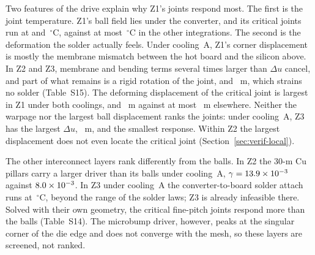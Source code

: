 Two features of the drive explain why Z1's joints respond most. The first is the joint temperature. Z1's ball field
lies under the converter, and its critical joints run at \MvTsjAZone{} and \MvTsjBZone\,$^\circ$C,
against at most \MvTsjAZthree\,$^\circ$C in the other integrations. The second is the deformation the
solder actually feels. Under cooling~A, Z1's corner displacement is mostly the membrane mismatch
between the hot board and the silicon above. In Z2 and Z3,
membrane and bending terms several times larger than $\Delta u$ cancel, and part of what remains is
a rigid rotation of the joint, \MvRigidRotAZtwo{} and \MvRigidRotAZthree~\textmu m, which strains no
solder (Table~S15). The deforming displacement of the critical joint is largest in Z1 under both
coolings, \MvDudefAZone{} and \MvDudefBZone~\textmu m against at most \MvDudefAZthree~\textmu m
elsewhere. Neither the warpage nor the largest ball displacement ranks the joints: under cooling~A,
Z3 has the largest $\Delta u$, \DuAZthree~\textmu m, and the smallest response. Within Z2 the largest
displacement does not even locate the critical joint (Section~\ref{sec:verif-local}).

The other interconnect layers rank differently from the balls. In Z2 the 30-\textmu m Cu pillars
carry a larger driver than its balls under cooling~A, $\gamma = 13.9\times10^{-3}$ against
$8.0\times10^{-3}$. In Z3 under cooling~A the converter-to-board solder attach runs at
\WrTAttAZthree\,$^\circ$C, beyond the range of the solder laws; Z3 is already infeasible there. Solved
with their own geometry, the critical fine-pitch joints respond more than the balls (Table~S14).
The microbump driver, however, peaks at the singular corner of the die edge and does not converge
with the mesh, so these layers are screened, not ranked.

